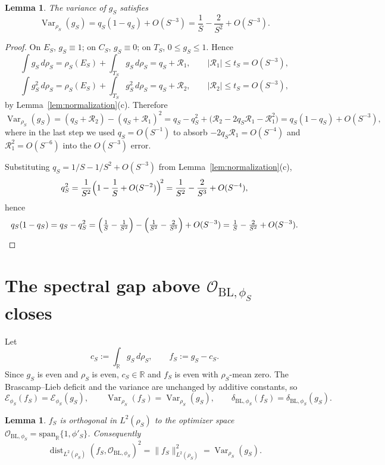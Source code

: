 \documentclass{article}
\newtheorem{lemma}[theorem]{Lemma}
\theoremstyle{remark}
\DeclareMathOperator{\Var}{Var}
\DeclareMathOperator{\dist}{dist}
\begin{document}
\begin{lemma}\label{lem:variance}
The variance of $g_S$ satisfies
\[
  \Var_{\rho_S}(g_S)
  = q_S(1-q_S)+O(S^{-3})
  = \frac{1}{S}-\frac{2}{S^2}+O(S^{-3}).
\]
\end{lemma}

\begin{proof}
On $E_S$, $g_S\equiv 1$; on $C_S$, $g_S\equiv 0$; on $T_S$, $0\le g_S\le 1$.
Hence
\[
  \int g_S\,d\rho_S
  = \rho_S(E_S)+\int_{T_S}g_S\,d\rho_S
  = q_S+\mathcal R_1,\qquad |\mathcal R_1|\le t_S=O(S^{-3}),
\]
\[
  \int g_S^2\,d\rho_S
  = \rho_S(E_S)+\int_{T_S}g_S^2\,d\rho_S
  = q_S+\mathcal R_2,\qquad |\mathcal R_2|\le t_S=O(S^{-3}),
\]
by Lemma~\ref{lem:normalization}(c). Therefore
\[
  \Var_{\rho_S}(g_S)
  =(q_S+\mathcal R_2)-(q_S+\mathcal R_1)^2
  = q_S-q_S^2+\bigl(\mathcal R_2-2q_S\mathcal R_1-\mathcal R_1^2\bigr)
  = q_S(1-q_S)+O(S^{-3}),
\]
where in the last step we used $q_S=O(S^{-1})$ to absorb $-2q_S\mathcal R_1
=O(S^{-4})$ and $\mathcal R_1^2=O(S^{-6})$ into the $O(S^{-3})$ error.

Substituting $q_S=1/S-1/S^2+O(S^{-3})$ from
Lemma~\ref{lem:normalization}(c),
\[
  q_S^2
  =\frac{1}{S^2}\Bigl(1-\frac{1}{S}+O(S^{-2})\Bigr)^{\!2}
  =\frac{1}{S^2}-\frac{2}{S^3}+O(S^{-4}),
\]
hence
\[
  q_S(1-q_S)=q_S-q_S^2
  =\Bigl(\tfrac{1}{S}-\tfrac{1}{S^2}\Bigr)-\Bigl(\tfrac{1}{S^2}-\tfrac{2}{S^3}\Bigr)+O(S^{-3})
  =\tfrac{1}{S}-\tfrac{2}{S^2}+O(S^{-3}). \qedhere
\]
\end{proof}

\section{\texorpdfstring{The spectral gap above
$\mathcal O_{\mathrm{BL},\phi_S}$ closes}{The spectral gap above OBL closes}}

Let
\[
  c_S := \int_{\mathbb R} g_S\,d\rho_S,\qquad
  f_S := g_S - c_S.
\]
Since $g_S$ is even and $\rho_S$ is even, $c_S\in\mathbb R$ and $f_S$ is even
with $\rho_S$-mean zero. The Brascamp--Lieb deficit and the variance are
unchanged by additive constants, so
\begin{equation}\label{eq:fS-vs-gS}
  \mathcal E_{\phi_S}(f_S)=\mathcal E_{\phi_S}(g_S),\qquad
  \Var_{\rho_S}(f_S)=\Var_{\rho_S}(g_S),\qquad
  \delta_{\mathrm{BL},\phi_S}(f_S)=\delta_{\mathrm{BL},\phi_S}(g_S).
\end{equation}

\begin{lemma}\label{lem:orth}
$f_S$ is orthogonal in $L^2(\rho_S)$ to the optimizer space
$\mathcal O_{\mathrm{BL},\phi_S}=\mathrm{span}_{\mathbb R}\{1,\phi'_S\}$.
Consequently
\[
  \dist_{L^2(\rho_S)}(f_S,\mathcal O_{\mathrm{BL},\phi_S})^2
  =\|f_S\|_{L^2(\rho_S)}^2
  =\Var_{\rho_S}(g_S).
\]
\end{lemma}
\end{document}
